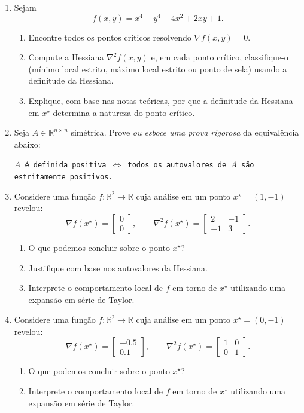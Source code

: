 \documentclass[10pt,a4paper]{extarticle}
\begin{document}
\begin{enumerate}[label=\textbf{Q\arabic*.}]
\bigskip

\item Sejam
\[
f(x,y)= x^4 + y^4 - 4x^2 + 2xy + 1.
\]
\begin{enumerate}[label=(\alph*)]
\item Encontre todos os pontos críticos resolvendo $\nabla f(x,y)=0$.
\item Compute a Hessiana $\nabla^2 f(x,y)$ e, em cada ponto crítico, classifique-o (mínimo local estrito, máximo local estrito ou ponto de sela) usando a definitude da Hessiana.
\item Explique, com base nas notas teóricas, por que a definitude da Hessiana em $x^\star$ determina a natureza do ponto crítico.
\end{enumerate}

\bigskip

\item Seja $A\in\mathbb{R}^{n\times n}$ simétrica. Prove \emph{ou esboce uma prova rigorosa} da equivalência abaixo:

\texttt{$A$ é definida positiva $\iff$ todos os autovalores de $A$ são estritamente positivos.}

\item Considere uma função \( f:\mathbb{R}^2 \to \mathbb{R} \) cuja análise em um ponto \( x^\star = (1, -1) \) revelou:
\[
\nabla f(x^\star) =
\begin{bmatrix}
0\\
0
\end{bmatrix},
\qquad
\nabla^2 f(x^\star) =
\begin{bmatrix}
2 & -1\\
-1 & 3
\end{bmatrix}.
\]
\begin{enumerate}[label=(\alph*)]
\item O que podemos concluir sobre o ponto \( x^\star \)?
\item Justifique com base nos autovalores da Hessiana.
\item Interprete o comportamento local de \( f \) em torno de \( x^\star \) utilizando uma expansão em série de Taylor.
\end{enumerate}

\item Considere uma função \( f:\mathbb{R}^2 \to \mathbb{R} \) cuja análise em um ponto \( x^\star = (0, -1) \) revelou:
\[
\nabla f(x^\star) =
\begin{bmatrix}
-0.5\\
0.1
\end{bmatrix},
\qquad
\nabla^2 f(x^\star) =
\begin{bmatrix}
1 & 0\\
0 & 1
\end{bmatrix}.
\]
\begin{enumerate}[label=(\alph*)]
\item O que podemos concluir sobre o ponto \( x^\star \)?
\item Interprete o comportamento local de \( f \) em torno de \( x^\star \) utilizando uma expansão em série de Taylor.
\end{enumerate}

\end{enumerate}
\end{document}

